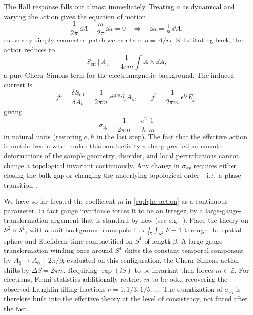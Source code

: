 The Hall response falls out almost immediately. Treating $a$ as dynamical and varying the action gives the equation of motion
\begin{equation}
  \frac{1}{2\pi}\,\dd A - \frac{m}{2\pi}\,\dd a = 0
  \quad\Longrightarrow\quad
  \dd a = \tfrac{1}{m}\,\dd A,
  \label{eq:fqhe-eom}
\end{equation}
so on any simply connected patch we can take $a = A/m$. Substituting back, the action reduces to
\begin{equation}
  S_{\mathrm{eff}}[A]
  =
  \frac{1}{4\pi m}\int A\wedge\dd A,
  \label{eq:fqhe-effective-action}
\end{equation}
a pure Chern--Simons term for the electromagnetic background. The induced current is
\begin{equation}
  j^\mu
  = \frac{\delta S_{\mathrm{eff}}}{\delta A_\mu}
  = \frac{1}{2\pi m}\,\epsilon^{\mu\nu\rho}\partial_\nu A_\rho,
  \qquad
  j^i = \frac{1}{2\pi m}\,\epsilon^{ij}E_j,
  \label{eq:fqhe-current}
\end{equation}
giving
\begin{equation}
  \sigma_{xy} = \frac{1}{2\pi m} = \frac{e^2}{h}\,\frac{1}{m}
  \label{eq:fqhe-conductance-derived}
\end{equation}
in natural units (restoring $e,\hbar$ in the last step). The fact that the effective action is metric-free is what makes this conductivity a sharp prediction: smooth deformations of the sample geometry, disorder, and local perturbations cannot change a topological invariant continuously. Any change in $\sigma_{xy}$ requires either closing the bulk gap or changing the underlying topological order---i.e.\ a phase transition \cite{Wen1990TopologicalOrders,Wen1995TopologicalOrdersEdgeExcitations}.

We have so far treated the coefficient $m$ in \eqref{eq:fqhe-action} as a continuous parameter. In fact gauge invariance forces it to be an integer, by a large-gauge-transformation argument that is standard by now (see e.g.\ \cite{Dunne1999AspectsCS,TongQuantumHallLectures}). Place the theory on $S^{2}\times S^{1}$, with a unit background monopole flux $\frac{1}{2\pi}\int_{S^{2}}F=1$ through the spatial sphere and Euclidean time compactified on $S^{1}$ of length $\beta$. A large gauge transformation winding once around $S^{1}$ shifts the constant temporal component by $A_0\to A_0+2\pi/\beta$; evaluated on this configuration, the Chern--Simons action shifts by $\Delta S = 2\pi m$. Requiring $\exp(iS)$ to be invariant then forces $m\in\mathbb{Z}$. For electrons, Fermi statistics additionally restrict $m$ to be odd, recovering the observed Laughlin filling fractions $\nu=1,1/3,1/5,\ldots$. The quantization of $\sigma_{xy}$ is therefore built into the effective theory at the level of consistency, not fitted after the fact.

